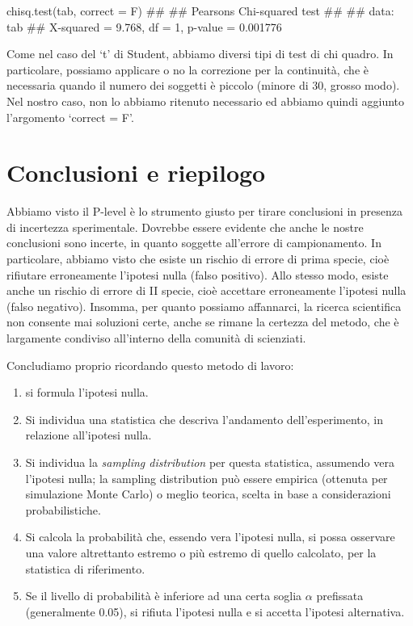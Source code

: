 \documentclass[a4paper,12pt,oneside]{book}
\providecommand{\tightlist}{%
  \setlength{\itemsep}{0pt}\setlength{\parskip}{0pt}}
\newenvironment{Shaded}{\begin{snugshade}}{\end{snugshade}}
\newcommand{\DocumentationTok}[1]{#1}
\newcommand{\FunctionTok}[1]{#1}
\newcommand{\AttributeTok}[1]{#1}
\newcommand{\NormalTok}[1]{#1}
\begin{document}
\begin{Shaded}
\begin{Highlighting}[]
\FunctionTok{chisq.test}\NormalTok{(tab, }\AttributeTok{correct =}\NormalTok{ F)}
\DocumentationTok{\#\# }
\DocumentationTok{\#\#  Pearson\textquotesingle{}s Chi{-}squared test}
\DocumentationTok{\#\# }
\DocumentationTok{\#\# data:  tab}
\DocumentationTok{\#\# X{-}squared = 9.768, df = 1, p{-}value = 0.001776}
\end{Highlighting}
\end{Shaded}

Come nel caso del `t' di Student, abbiamo diversi tipi di test di chi quadro. In particolare, possiamo applicare o no la correzione per la continuità, che è necessaria quando il numero dei soggetti è piccolo (minore di 30, grosso modo). Nel nostro caso, non lo abbiamo ritenuto necessario ed abbiamo quindi aggiunto l'argomento `correct = F'.

\hypertarget{conclusioni-e-riepilogo}{%
\section{Conclusioni e riepilogo}\label{conclusioni-e-riepilogo}}

Abbiamo visto il P-level è lo strumento giusto per tirare conclusioni in presenza di incertezza sperimentale. Dovrebbe essere evidente che anche le nostre conclusioni sono incerte, in quanto soggette all'errore di campionamento. In particolare, abbiamo visto che esiste un rischio di errore di prima specie, cioè rifiutare erroneamente l'ipotesi nulla (falso positivo). Allo stesso modo, esiste anche un rischio di errore di II specie, cioè accettare erroneamente l'ipotesi nulla (falso negativo). Insomma, per quanto possiamo affannarci, la ricerca scientifica non consente mai soluzioni certe, anche se rimane la certezza del metodo, che è largamente condiviso all'interno della comunità di scienziati.

Concludiamo proprio ricordando questo metodo di lavoro:

\begin{enumerate}
\def\labelenumi{\arabic{enumi}.}
\tightlist
\item
  si formula l'ipotesi nulla.
\item
  Si individua una statistica che descriva l'andamento dell'esperimento, in relazione all'ipotesi nulla.
\item
  Si individua la \emph{sampling distribution} per questa statistica, assumendo vera l'ipotesi nulla; la sampling distribution può essere empirica (ottenuta per simulazione Monte Carlo) o meglio teorica, scelta in base a considerazioni probabilistiche.
\item
  Si calcola la probabilità che, essendo vera l'ipotesi nulla, si possa osservare una valore altrettanto estremo o più estremo di quello calcolato, per la statistica di riferimento.
\item
  Se il livello di probabilità è inferiore ad una certa soglia \(\alpha\) prefissata (generalmente 0.05), si rifiuta l'ipotesi nulla e si accetta l'ipotesi alternativa.
\end{enumerate}
\end{document}
